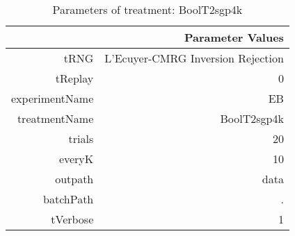 \begin{table}[ht]
\centering
\begin{tabular}{rr}
  \hline
 & Parameter Values \\ 
  \hline
tRNG & L'Ecuyer-CMRG Inversion Rejection \\ 
  tReplay & 0 \\ 
  experimentName & EB \\ 
  treatmentName & BoolT2sgp4k \\ 
  trials & 20 \\ 
  everyK & 10 \\ 
  outpath & data \\ 
  batchPath & . \\ 
  tVerbose & 1 \\ 
   \hline
\end{tabular}
\caption{ Parameters of treatment: BoolT2sgp4k 
} 
\end{table}
